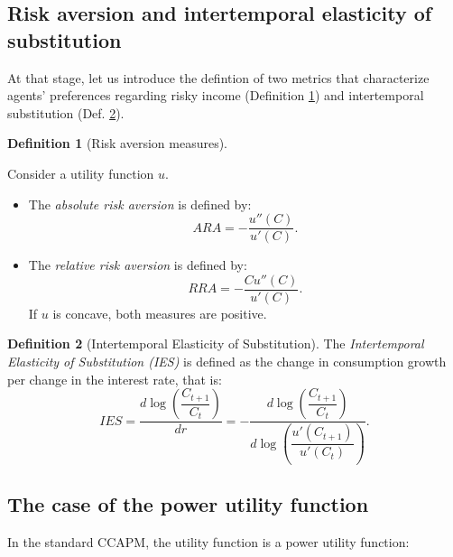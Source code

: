 \documentclass[
  12pt,
]{book}
\providecommand{\tightlist}{%
  \setlength{\itemsep}{0pt}\setlength{\parskip}{0pt}}
\theoremstyle{definition}
\newtheorem{definition}{Definition}[chapter]
\theoremstyle{definition}
\theoremstyle{definition}
\theoremstyle{definition}
\theoremstyle{remark}
\begin{document}
\hypertarget{risk-aversion-and-intertemporal-elasticity-of-substitution}{%
\subsection{Risk aversion and intertemporal elasticity of substitution}\label{risk-aversion-and-intertemporal-elasticity-of-substitution}}

At that stage, let us introduce the defintion of two metrics that characterize agents' preferences regarding risky income (Definition \ref{def:RAmeasures}) and intertemporal substitution (Def. \ref{def:IES}).

\begin{definition}[Risk aversion measures]
\protect\hypertarget{def:RAmeasures}{}\label{def:RAmeasures}

Consider a utility function \(u\).

\begin{itemize}
\tightlist
\item
  The \emph{absolute risk aversion} is defined by:
  \[
  ARA = - \frac{u''(C)}{u'(C)}.
  \]
\item
  The \emph{relative risk aversion} is defined by:
  \[
  RRA = - \frac{C u''(C)}{u'(C)}.
  \]
  If \(u\) is concave, both measures are positive.
\end{itemize}

\end{definition}

\begin{definition}[Intertemporal Elasticity of Substitution]
\protect\hypertarget{def:IES}{}\label{def:IES}The \emph{Intertemporal Elasticity of Substitution (IES)} is defined as the change in consumption growth per change in the interest rate, that is:
\[
IES = \frac{d \log\left( \dfrac{C_{t+1}}{C_{t}}\right)}{d r} = - \frac{d \log\left( \dfrac{C_{t+1}}{C_{t}}\right)}{d\log\left(\dfrac{u'(C_{t+1})}{u'(C_{t})}\right)}.
\]
\end{definition}

\hypertarget{the-case-of-the-power-utility-function}{%
\subsection{The case of the power utility function}\label{the-case-of-the-power-utility-function}}

In the standard CCAPM, the utility function is a power utility function:
\end{document}
